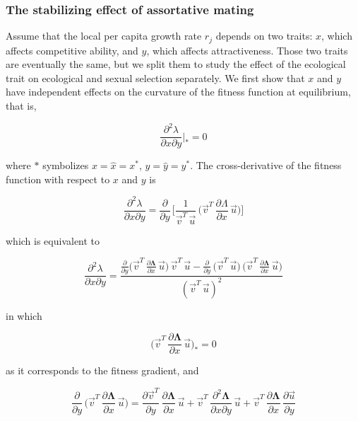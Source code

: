 \subsubsection*{The stabilizing effect of assortative mating}

Assume that the local per capita growth rate $r_j$ depends on two traits: $x$, which affects competitive ability, and $y$, which affects attractiveness. Those two traits are eventually the same, but we split them to study the effect of the ecological trait on ecological and sexual selection separately. We first show that $x$ and $y$ have independent effects on the curvature of the fitness function at equilibrium, that is,

\begin{equation}
    \frac{\partial^2 \lambda}{\partial x \partial y}\bigg|_* = 0
\end{equation}

where $*$ symbolizes $x=\hat x=x^*$, $y=\hat y=y^*$. The cross-derivative of the fitness function with respect to $x$ and $y$ is

\begin{equation}
    \frac{\partial^2 \lambda}{\partial x \partial y} = \frac{\partial}{\partial y}\,\Bigg[\frac{1}{\overrightarrow{v}^T\,\overrightarrow{u}}\,\bigg( \overrightarrow{v}^T\,\frac{\partial \Lambda}{\partial x}\,\overrightarrow{u} \bigg)\Bigg]
\end{equation}

which is equivalent to

\begin{equation}
    \frac{\partial^2 \lambda}{\partial x \partial y} = \frac{\frac{\partial}{\partial y}\Big(\overrightarrow{v}^T\,\frac{\partial \pmb \Lambda}{\partial x}\,\overrightarrow{u}\Big)\,\overrightarrow{v}^T\,\overrightarrow{u}-\frac{\partial}{\partial y}\,\Big(\overrightarrow{v}^T\,\overrightarrow{u}\Big)\,\Big(\overrightarrow{v}^T\,\frac{\partial \pmb \Lambda}{\partial x}\,\overrightarrow{u}\Big)}{(\overrightarrow{v}^T\,\overrightarrow{u})^2}
\end{equation}

in which

\begin{equation}
    \bigg(\overrightarrow{v}^T\,\frac{\partial \pmb \Lambda}{\partial x}\,\overrightarrow{u}\bigg)_* = 0
\end{equation}

as it corresponds to the fitness gradient, and

\begin{equation}
    \frac{\partial}{\partial y}\,\bigg(\overrightarrow{v}^T\,\frac{\partial \pmb \Lambda}{\partial x}\,\overrightarrow{u}\bigg) = \frac{\partial \overrightarrow{v}^T}{\partial y}\,\frac{\partial \pmb \Lambda}{\partial x}\,\overrightarrow{u}+\overrightarrow{v}^T\,\frac{\partial^2 \pmb \Lambda}{\partial x \partial y}\,\overrightarrow{u}+\overrightarrow{v}^T\,\frac{\partial \pmb \Lambda}{\partial x}\,\frac{\partial \overrightarrow{u}}{\partial y}   
    \label{eq:deriv_lambda_x_y}
\end{equation}

